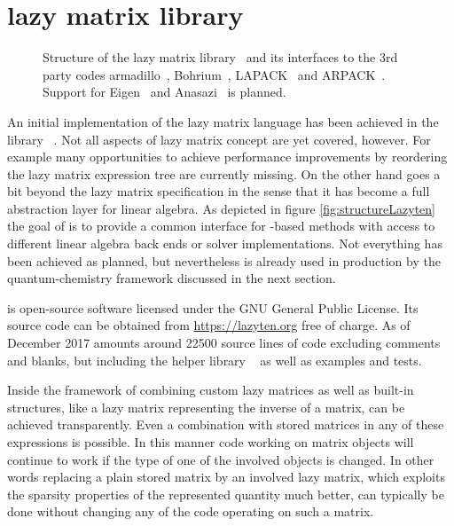 \section{\lazyten lazy matrix library}
\begin{figure}
	\centering
	\caption[Structure of the \lazyten lazy matrix library]{%
		Structure of the \lazyten lazy matrix library~\cite{lazytenWeb}
		and its interfaces to the 3rd party codes
		armadillo~\cite{Armadillo}, Bohrium~\cite{Kristensen2016array,Kristensen2016streaming},
		LAPACK~\cite{LAPACK} and ARPACK~\cite{ARPACK}.
		Support for Eigen~\cite{Eigen} and Anasazi~\cite{Anasazi} is planned.
	}
	\label{fig:structureLazyten}
\end{figure}
An initial implementation of the lazy matrix language has been
achieved in the \cpp library \lazyten~\cite{lazytenWeb}.
Not all aspects of lazy matrix concept are yet covered, however.
For example many opportunities to achieve performance improvements
by reordering the lazy matrix expression tree are currently missing.
On the other hand \lazyten goes a bit beyond the lazy matrix specification
in the sense that it has become a full abstraction layer for linear algebra.
As depicted in figure \vref{fig:structureLazyten}
the goal of \lazyten is to provide a common interface
for \contraction-based methods
with access to different linear algebra back ends or solver implementations.
Not everything has been achieved as planned,
but nevertheless \lazyten is already used in production
by the \molsturm quantum-chemistry framework discussed in the next section.

\lazyten is open-source software licensed under the
GNU General Public License.
Its source code can be obtained from \url{https://lazyten.org} free of charge.
As of December 2017 \lazyten amounts around 22500 source lines of code
excluding comments and blanks,
but including the helper library \krims~\cite{krimsWeb}
as well as examples and tests.

Inside the framework of \lazyten combining custom lazy matrices
as well as built-in structures,
like a lazy matrix representing the inverse of a matrix,
can be achieved transparently.
Even a combination with stored matrices in any of these expressions is possible.
In this manner code working on \lazyten matrix objects
will continue to work if the type of one of the involved objects is changed.
In other words replacing a plain stored matrix by an involved lazy matrix,
which exploits the sparsity properties of the represented quantity
much better,
can typically be done without changing any of the code operating on such a matrix.

